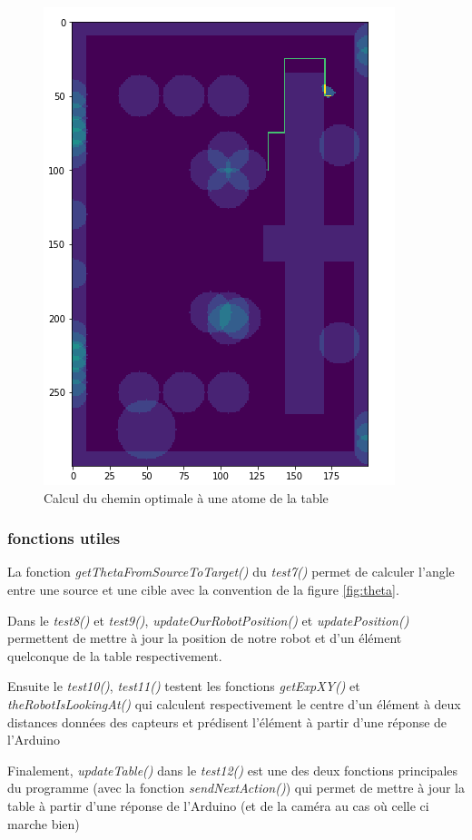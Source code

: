 \documentclass{article}
\begin{document}
\begin{figure}[!h]
\centering
\includegraphics[scale=0.6]{tests2}
\caption{Calcul du chemin optimale à une atome de la table}
\label{fig:tests2}
\end{figure}

\subsubsection{fonctions utiles}

La fonction \textit{getThetaFromSourceToTarget()} du \textit{test7()} permet de calculer l'angle entre une source et une cible avec la convention de la figure \ref{fig:theta}.

Dans le \textit{test8()} et \textit{test9()},  \textit{updateOurRobotPosition()} et \textit{updatePosition()} permettent de mettre à jour la position de notre robot et d'un élément quelconque de la table respectivement.

Ensuite le \textit{test10()}, \textit{test11()} testent les fonctions \textit{getExpXY()} et \textit{theRobotIsLookingAt()} qui calculent respectivement le centre d'un élément à deux distances données des capteurs et prédisent l'élément à partir d'une réponse de l'Arduino

Finalement, \textit{updateTable()} dans le \textit{test12()} est une des deux fonctions principales du programme (avec la fonction \textit{sendNextAction()}) qui permet de mettre à jour la table à partir d'une réponse de l'Arduino (et de la caméra au cas où celle ci marche bien)
\end{document}
